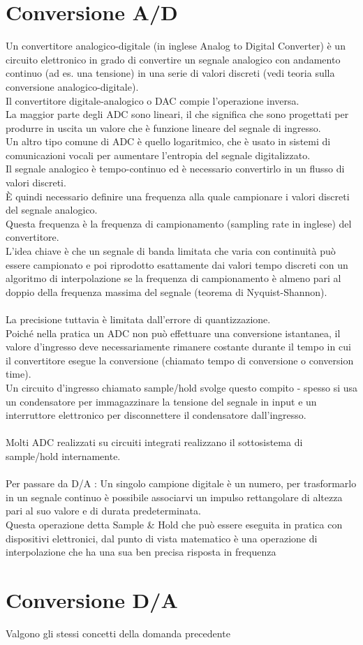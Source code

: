 \documentclass{article}
\numberwithin{equation}{subsection}
\begin{document}
	\section{Conversione A/D}
	Un convertitore analogico-digitale (in inglese Analog to Digital Converter) è un circuito elettronico in grado di convertire un segnale analogico con andamento continuo (ad es. una tensione) in una serie di valori discreti (vedi teoria sulla conversione analogico-digitale).\\
	Il convertitore digitale-analogico o DAC compie l'operazione inversa. \\
	La maggior parte degli ADC sono lineari, il che significa che sono progettati per produrre in uscita un valore che è funzione lineare del segnale di ingresso. \\
	Un altro tipo comune di ADC è quello logaritmico, che è usato in sistemi di comunicazioni vocali per aumentare l'entropia del segnale digitalizzato. \\
	Il segnale analogico è tempo-continuo ed è necessario convertirlo in un flusso di valori discreti. \\
	È quindi necessario definire una frequenza alla quale campionare i valori discreti del segnale analogico. \\
	Questa frequenza è la frequenza di campionamento (sampling rate in inglese) del convertitore. \\
	L'idea chiave è che un segnale di banda limitata che varia con continuità può essere campionato e poi riprodotto esattamente dai valori tempo discreti con un algoritmo di interpolazione se la frequenza di campionamento è almeno pari al doppio della frequenza massima del segnale (teorema di Nyquist-Shannon).\\\\
	La precisione tuttavia è limitata dall'errore di quantizzazione. \\
	Poiché nella pratica un ADC non può effettuare una conversione istantanea, il valore d'ingresso deve necessariamente
	rimanere costante durante il tempo in cui il convertitore esegue la conversione (chiamato
	tempo di conversione o conversion time). \\
	Un circuito d'ingresso chiamato sample/hold svolge questo compito - spesso si usa un condensatore per immagazzinare la tensione del segnale in input e un interruttore elettronico per disconnettere il condensatore dall'ingresso.\\\\
	Molti ADC realizzati su circuiti integrati realizzano il sottosistema di sample/hold internamente.\\\\
	Per passare da D/A : Un singolo campione digitale è un numero, per trasformarlo in un segnale continuo è possibile associarvi un impulso rettangolare di altezza pari al suo valore e di durata predeterminata. \\
	Questa operazione detta Sample \& Hold che può essere eseguita in pratica con dispositivi elettronici, dal punto di vista matematico è una operazione di interpolazione che ha una sua ben precisa risposta in frequenza
	\section{Conversione D/A}
	Valgono gli stessi concetti della domanda precedente
	
\end{document}
